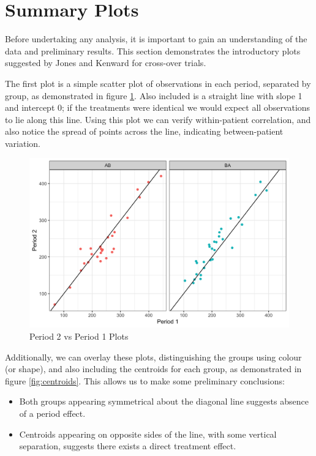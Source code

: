 \documentclass[12pt, TexShade, letterpaper]{report}
\begin{document}
\section{Summary Plots}
Before undertaking any analysis, it is important to gain an understanding of the data and preliminary results. This section demonstrates the introductory plots suggested by Jones and Kenward \cite{jones2003design} for cross-over trials.

The first plot is a simple scatter plot of observations in each period, separated by group, as demonstrated in figure \ref{fig:period2vsperiod1}. Also included is a straight line with slope 1 and intercept 0; if the treatments were identical we would expect all observations to lie along this line. Using this plot we can verify within-patient correlation, and also notice the spread of points across the line, indicating between-patient variation.

\begin{figure}[ht]
    \centering
    \includegraphics[width=0.85\linewidth]{report/figures/periodsPlot.png}
    \caption{Period 2 vs Period 1 Plots}
    \label{fig:period2vsperiod1}
\end{figure}

Additionally, we can overlay these plots, distinguishing the groups using colour (or shape), and also including the centroids for each group, as demonstrated in figure \ref{fig:centroids}. This allows us to make some preliminary conclusions:
\begin{itemize}
    \item Both groups appearing symmetrical about the diagonal line suggests absence of a period effect.
    \item Centroids appearing on opposite sides of the line, with some vertical separation, suggests there exists a direct treatment effect.
\end{itemize}
\end{document}
